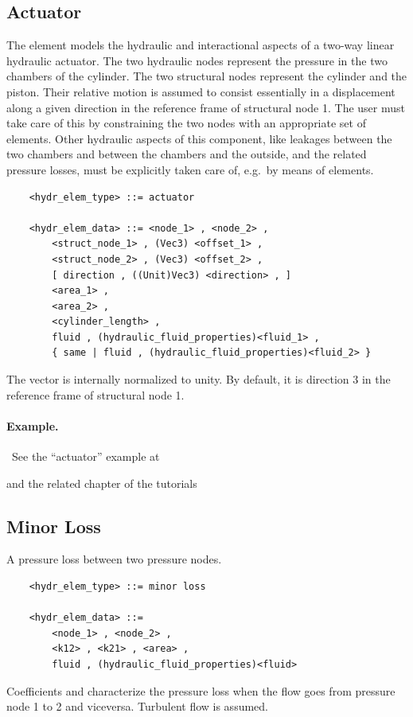 \subsection{Actuator}
The  element models the hydraulic and interactional aspects
of a two-way linear hydraulic actuator.
The two hydraulic nodes represent the pressure in the two chambers
of the cylinder.
The two structural nodes represent the cylinder and the piston.
Their relative motion is assumed to consist essentially
in a displacement along a given direction in the reference frame
of structural node 1.
The user must take care of this by constraining the two nodes
with an appropriate set of  elements.
Other hydraulic aspects of this component, like leakages between
the two chambers and between the chambers and the outside,
and the related pressure losses, must be explicitly taken care of,
e.g.\ by means of  elements.
\label{sec:EL:HYDR:ACTUATOR}
\begin{verbatim}
    <hydr_elem_type> ::= actuator

    <hydr_elem_data> ::= <node_1> , <node_2> , 
        <struct_node_1> , (Vec3) <offset_1> ,
        <struct_node_2> , (Vec3) <offset_2> ,
        [ direction , ((Unit)Vec3) <direction> , ]
        <area_1> ,
        <area_2> ,
        <cylinder_length> ,
        fluid , (hydraulic_fluid_properties)<fluid_1> ,
        { same | fluid , (hydraulic_fluid_properties)<fluid_2> }
\end{verbatim}
The vector  is internally normalized to unity.
By default, it is direction 3 in the reference frame of structural node 1.

\paragraph{Example.} \
See the ``actuator'' example at
\begin{quote}
\end{quote}
and the related chapter of the tutorials
\begin{quote}
\end{quote}



\subsection{Minor Loss}
A pressure loss between two pressure nodes.
\label{sec:EL:HYDR:MINOR_LOSS}
\begin{verbatim}
    <hydr_elem_type> ::= minor loss

    <hydr_elem_data> ::=
        <node_1> , <node_2> ,
        <k12> , <k21> , <area> ,
        fluid , (hydraulic_fluid_properties)<fluid>
\end{verbatim}
Coefficients  and  characterize the pressure loss
when the flow goes from pressure node 1 to 2 and viceversa.
Turbulent flow is assumed.



